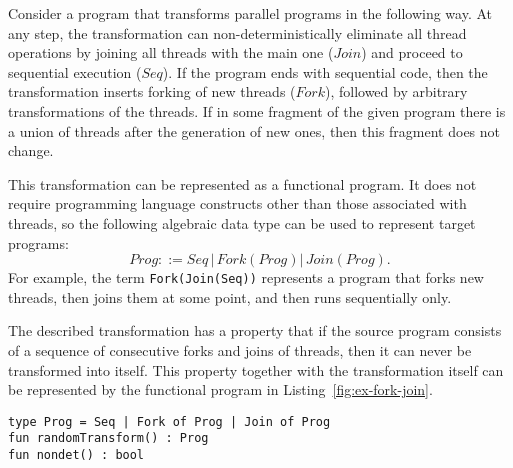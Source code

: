 \begin{example}[$ForkJoin$]\label{ex:fork-join-chcs}
Consider a program that transforms parallel programs in the following way.
At any step, the transformation can non-deterministically eliminate all thread operations by joining all threads with the main one ($Join$) and proceed to sequential execution ($Seq$).
If the program ends with sequential code, then the transformation inserts forking of new threads ($Fork$), followed by arbitrary transformations of the threads.
If in some fragment of the given program there is a union of threads after the generation of new ones, then this fragment does not change.

This transformation can be represented as a functional program. It does not require programming language constructs other than those associated with threads, so the following algebraic data type can be used to represent target programs:
$$ Prog ::= Seq\,|\,Fork(Prog)|\,Join(Prog). $$
For example, the term \texttt{Fork(Join(Seq))} represents a program that forks new threads, then joins them at some point, and then runs sequentially only.

The described transformation has a property that if the source program consists of a sequence of consecutive forks and joins of threads, then it can never be transformed into itself.
This property together with the transformation itself can be represented by the functional program in Listing~\ref{fig:ex-fork-join}.
\begin{mylisting}
\begin{verbatim}
type Prog = Seq | Fork of Prog | Join of Prog
fun randomTransform() : Prog
fun nondet() : bool


\end{verbatim}
\end{mylisting}
\end{example}
